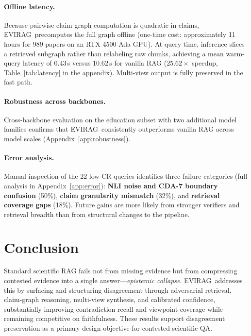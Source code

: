 \documentclass[11pt]{article}
\newcommand{\system}{\textsc{EVIRAG}\xspace}
\begin{document}
\paragraph{Offline latency.}
Because pairwise claim-graph computation is quadratic in claims, \system\
precomputes the full graph offline (one-time cost: approximately 11 hours for 989 papers on an RTX 4500 Ada GPU).
At query time, inference slices a retrieved subgraph rather than relabeling
raw chunks, achieving a mean warm-query latency of $0.43$\,s versus
$10.62$\,s for vanilla RAG ($25.62{\times}$ speedup, Table~\ref{tab:latency}
in the appendix).  Multi-view output is fully preserved in the fast path.

\paragraph{Robustness across backbones.}
Cross-backbone evaluation on the education subset with two additional model
families confirms that \system\ consistently outperforms vanilla RAG across
model scales (Appendix~\ref{app:robustness}).

\paragraph{Error analysis.}
\label{sec:error}
Manual inspection of the 22 low-CR queries identifies three failure
categories (full analysis in Appendix~\ref{app:error}):
\textbf{NLI noise and CDA-7 boundary confusion} (50\%),
\textbf{claim granularity mismatch} (32\%), and
\textbf{retrieval coverage gaps} (18\%).
Future gains are more likely from stronger verifiers and retrieval
breadth than from structural changes to the pipeline.

\section{Conclusion}
\label{sec:conclusion}

Standard scientific RAG fails not from missing evidence but from compressing
contested evidence into a single answer---\emph{epistemic collapse}.
\system\ addresses this by surfacing and structuring disagreement through
adversarial retrieval, claim-graph reasoning, multi-view synthesis, and
calibrated confidence, substantially improving contradiction recall and
viewpoint coverage while remaining competitive on faithfulness.
These results support disagreement preservation as a primary design
objective for contested scientific QA.
\end{document}
